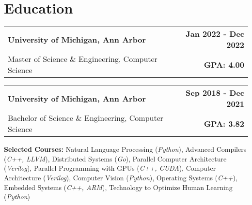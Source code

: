 \documentclass[11pt]{extreport}
\makeatletter
\newcommand{\resumeSubheading}[4]{
  \vspace{-1pt}
    \begin{tabular*}{1.0\textwidth}{l@{\extracolsep{\fill}}r}
      \textbf{#1} & \textbf{#2}  \vspace{1mm} \\
      {#3} & \textbf{#4} \\
    \end{tabular*}\vspace{-3pt}
}
\makeatother
\begin{document}
\section{Education}
        \resumeSubheading{University of Michigan, Ann Arbor} {Jan 2022 - Dec 2022}
      {Master of Science \& Engineering, Computer Science}{GPA: 4.00}
     
      \vspace{2mm}
    \resumeSubheading{University of Michigan, Ann Arbor}{Sep 2018 - Dec 2021}
      {Bachelor of Science \& Engineering, Computer Science}{GPA: 3.82}
            \vspace{2mm}

      {\textbf{Selected Courses:} Natural Language Processing (\textit{Python}), Advanced Compilers (\textit{C++, LLVM}), Distributed Systems (\textit{Go}), Parallel Computer Architecture (\textit{Verilog}), Parallel Programming with GPUs (\textit{C++, CUDA}), Computer Architecture (\textit{Verilog}), Computer Vision (\textit{Python}), Operating Systems (\textit{C++}), Embedded Systems (\textit{C++, ARM}), Technology to Optimize Human Learning (\textit{Python}) }{}

\vspace{-1.5mm}
\vspace{-5pt}
\end{document}
